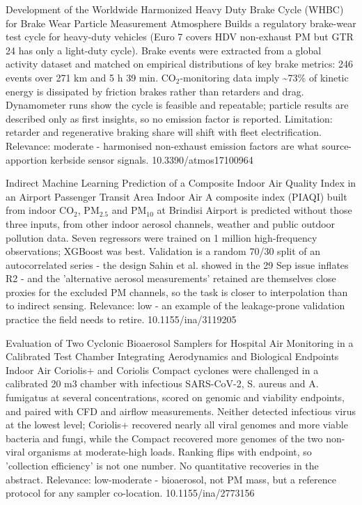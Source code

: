 \documentclass[10pt]{article}
\begin{document}
{Development of the Worldwide Harmonized Heavy Duty Brake Cycle (WHBC) for Brake Wear Particle Measurement}
{Atmosphere}
{Builds a regulatory brake-wear test cycle for heavy-duty vehicles (Euro 7 covers HDV non-exhaust PM but GTR 24 has only a light-duty cycle). Brake events were extracted from a global activity dataset and matched on empirical distributions of key brake metrics: 246 events over 271 km and 5 h 39 min. CO$_2$-monitoring data imply \textasciitilde{}73\% of kinetic energy is dissipated by friction brakes rather than retarders and drag. Dynamometer runs show the cycle is feasible and repeatable; particle results are described only as first insights, so no emission factor is reported. Limitation: retarder and regenerative braking share will shift with fleet electrification. Relevance: moderate - harmonised non-exhaust emission factors are what source-apportion kerbside sensor signals.}
{10.3390/atmos17100964}

{Indirect Machine Learning Prediction of a Composite Indoor Air Quality Index in an Airport Passenger Transit Area}
{Indoor Air}
{A composite index (PIAQI) built from indoor CO$_2$, PM$_{2.5}$ and PM$_{10}$ at Brindisi Airport is predicted without those three inputs, from other indoor aerosol channels, weather and public outdoor pollution data. Seven regressors were trained on 1 million high-frequency observations; XGBoost was best. Validation is a random 70/30 split of an autocorrelated series - the design Sahin et al. showed in the 29 Sep issue inflates R2 - and the 'alternative aerosol measurements' retained are themselves close proxies for the excluded PM channels, so the task is closer to interpolation than to indirect sensing. Relevance: low - an example of the leakage-prone validation practice the field needs to retire.}
{10.1155/ina/3119205}

{Evaluation of Two Cyclonic Bioaerosol Samplers for Hospital Air Monitoring in a Calibrated Test Chamber Integrating Aerodynamics and Biological Endpoints}
{Indoor Air}
{Coriolis+ and Coriolis Compact cyclones were challenged in a calibrated 20 m3 chamber with infectious SARS-CoV-2, S. aureus and A. fumigatus at several concentrations, scored on genomic and viability endpoints, and paired with CFD and airflow measurements. Neither detected infectious virus at the lowest level; Coriolis+ recovered nearly all viral genomes and more viable bacteria and fungi, while the Compact recovered more genomes of the two non-viral organisms at moderate-high loads. Ranking flips with endpoint, so 'collection efficiency' is not one number. No quantitative recoveries in the abstract. Relevance: low-moderate - bioaerosol, not PM mass, but a reference protocol for any sampler co-location.}
{10.1155/ina/2773156}
\end{document}
